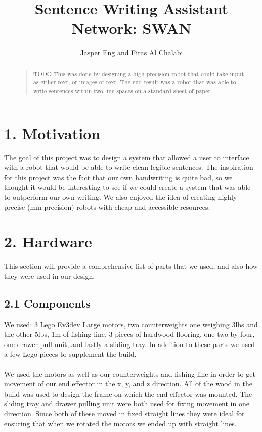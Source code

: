 \documentclass[letterpaper]{article}
\begin{document}
 
\title{Sentence Writing Assistant Network: SWAN}
\author{Jasper Eng and Firas Al Chalabi}
\maketitle
\begin{abstract}
\begin{quote}
TODO
 This was done by designing a high precision robot that could take input as either text, or images of text. The end result was a robot that was able to write sentences within two line spaces on a standard sheet of paper.
\end{quote}
\end{abstract}

\section{1. Motivation}
The goal of this project was to design a system that allowed a user to interface with a robot that would be able to write clean legible sentences. The inspiration for this project was the fact that our own handwriting is quite bad, so we thought it would be interesting to see if we could create a system that was able to outperform our own writing. We also enjoyed the idea of creating highly precise (mm precision) robots with cheap and accessible resources.

\section{2. Hardware}
This section will provide a comprehensive list of parts that we used, and also how they were used in our design.
\subsection{2.1 Components}
We used: 3 Lego Ev3dev Large motors, two counterweights one weighing 3lbs and the other 5lbs, 1m of fishing line, 3 pieces of hardwood flooring, one two by four, one drawer pull unit, and lastly a sliding tray. In addition to these parts we used a few Lego pieces to supplement the build.\\\\
%
We used the motors as well as our counterweights and fishing line in order to get movement of our end effector in the x, y, and z direction. All of the wood in the build was used to design the frame on which the end effector was mounted. The sliding tray and drawer pulling unit were both used for fixing movement in one direction. Since both of these moved in fixed straight lines they were ideal for ensuring that when we rotated the motors we ended up with straight lines.  
\end{document}
